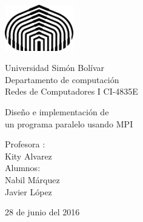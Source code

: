 

\begin{titlepage}

\setlength{\hoffset}{-0.2in}
\setlength{\voffset}{-1in}
\setlength{\topmargin}{1.5cm}
\setlength{\headheight}{0.5cm}
\setlength{\headsep}{1cm}
\setlength{\oddsidemargin}{3cm}
\setlength{\evensidemargin}{3cm}
\setlength{\footskip}{1.5cm}
\enlargethispage{1cm}

\fontsize{12pt}{14pt}
\selectfont

\begin{center}

\includegraphics[height=2cm]{logo.png}

\vspace{0.5cm}

Universidad Sim\'on Bol\'ivar\\
Departamento de computaci\'on\\
Redes de Computadores I CI-4835E\\

\vspace{3.5cm}

\fontsize{17.28pt}{21pt}
\selectfont

Diseño e implementación de \\
un programa paralelo usando MPI

\fontsize{12pt}{14pt}
\selectfont

\vspace{.6cm}



\vspace{.4cm}


\vspace{3.5cm}

Profesora : \\
Kity Alvarez\\
Alumnos: \\
Nabil M\'arquez\\
Javier  L\'opez

\vspace{2cm}


\vspace{1cm}

28 de junio del 2016

\end{center}
\end{titlepage}


